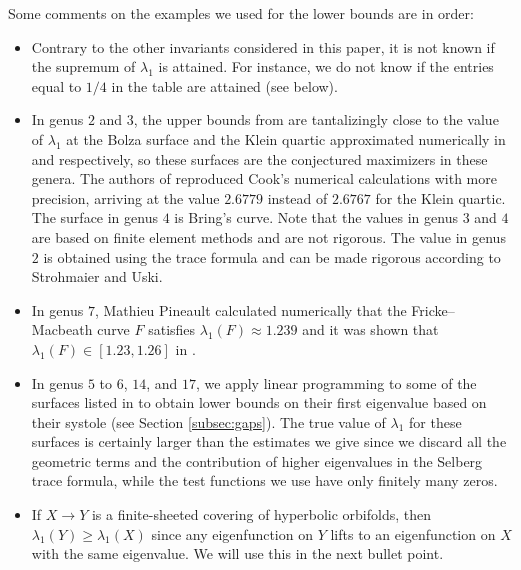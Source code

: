 \documentclass[12pt]{amsart}
\numberwithin{equation}{section}
\begin{document}
Some comments on the examples we used for the lower bounds are in order:
\begin{itemize}
\item Contrary to the other invariants considered in this paper, it is not known if the supremum of $\lambda_1$ is attained. For instance, we do not know if the entries equal to $1/4$ in the table are attained (see below).

\item In genus $2$ and $3$, the upper bounds from \cite{bootstrap,bootstrap2} are tantalizingly close to the value of $\lambda_1$ at the Bolza surface and the Klein quartic approximated numerically in \cite{StrohmaierUski} and \cite{Cook} respectively, so these surfaces are the conjectured maximi\-zers in these genera. The authors of \cite{bootstrap} reproduced Cook's numerical calculations with more precision, arriving at the value $2.6779$ instead of $2.6767$ for the Klein quartic. The surface in genus $4$ is Bring's curve. Note that the values in genus $3$ and $4$ are based on finite element methods and are not rigorous. The value in genus $2$ is obtained using the trace formula and can be made rigorous according to Strohmaier and Uski.  

\item In genus $7$, Mathieu Pineault calculated numerically that the Fricke--Macbeath curve $F$ satisfies $\lambda_1(F) \approx 1.239$ \cite{Pineault} and it was shown that $\lambda_1(F) \in [1.23,1.26]$ in \cite{Lee}.

\item In genus $5$ to $6$, $14$, and $17$, we apply linear programming to some of the surfaces listed in  to obtain lower bounds on their first eigenvalue based on their systole (see Section \ref{subsec:gaps}). The true value of $\lambda_1$ for these surfaces is certainly larger than the estimates we give since we discard all the geometric terms and the contribution of higher eigenvalues in the Selberg trace formula, while the test functions we use have only finitely many zeros. 

\item If $X \to Y$ is a finite-sheeted covering of hyperbolic orbifolds, then $\lambda_1(Y) \geq \lambda_1(X)$ since any eigenfunction on $Y$ lifts to an eigenfunction on $X$ with the same eigenvalue. We will use this in the next bullet point. 


\end{itemize}
\end{document}
